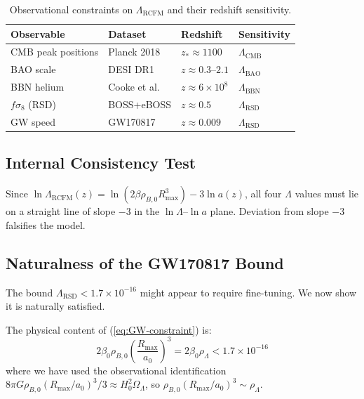 \documentclass[10pt,twocolumn]{article}
\theoremstyle{definition}
\newcommand{\Rmax}{R_{\max}}
\DeclareRobustCommand{\onecoltable}[2][]{%
  \begin{table}[#1]%
    \centering
    #2
  \end{table}%
}
\begin{document}
\onecoltable[htb]{%
  \centering
  \caption{Observational constraints on \( \Lambda_{\mathrm{RCFM}} \) and their redshift sensitivity.}
  \label{tab:constraints}
  \begin{tabular}{lllp{3.5cm}}
  \toprule
  Observable & Dataset & Redshift & Sensitivity\\
  \midrule
  CMB peak positions
    & Planck 2018 \citep{PlanckVI2020}
    & \( z_{*}\approx1100 \)
    & \( \Lambda_{\mathrm{CMB}} \)\\
  BAO scale
    & DESI DR1 \citep{DESI2024}
    & \( z\approx0.3 \)--$2.1$
    & \( \Lambda_{\mathrm{BAO}} \)\\
  BBN helium
    & Cooke et al.\ \citep{Cooke2018}
    & \( z\approx6\times10^{8} \)
    & \( \Lambda_{\mathrm{BBN}} \)\\
  \( f\sigma_{8} \) (RSD)
    & BOSS+eBOSS \citep{Alam2021}
    & \( z\approx0.5 \)
    & \( \Lambda_{\mathrm{RSD}} \)\\
  GW speed
    & GW170817 \citep{Abbott2017GW}
    & \( z\approx0.009 \)
    & \( \Lambda_{\mathrm{RSD}} \)\\
  \bottomrule
  \end{tabular}%
}

\subsection{Internal Consistency Test}

Since
$\ln\Lambda_{\mathrm{RCFM}}(z)=
\ln(2\beta\rho_{B,0}\Rmax^{3})-3\ln a(z)$,
all four \( \Lambda \) values must lie on a straight line
of slope \( -3 \) in the \( \ln\Lambda \)--\( \ln a \) plane.
Deviation from slope \( -3 \) falsifies the model.

\subsection{Naturalness of the GW170817 Bound}
\label{sec:naturalness}

The bound \( \Lambda_{\mathrm{RSD}}<1.7\times10^{-16} \)
might appear to require fine-tuning.  We now show it is
naturally satisfied.

The physical content of (\ref{eq:GW-constraint}) is:
\begin{equation}
  2\beta_{0}\rho_{B,0}\left(\frac{\Rmax}{a_{0}}\right)^{3}
    = 2\beta_{0}\rho_{\Lambda}
    < 1.7\times10^{-16}
\end{equation}
where we have used the observational identification
$8\pi G\rho_{B,0}(\Rmax/a_{0})^{3}/3 \approx H_{0}^{2}\Omega_{\Lambda}$,
so \( \rho_{B,0}(\Rmax/a_{0})^{3}\sim\rho_{\Lambda} \).
\end{document}
